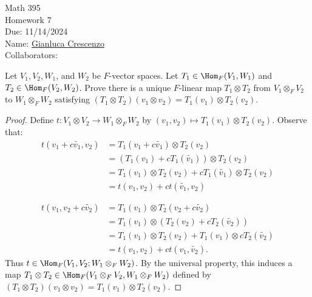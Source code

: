\documentclass[10pt,twoside,openany]{memoir}
\begin{document}
\begin{center}
    { \Large Math 395 \\[0.1in]Homework 7\\[0.1in]
    Due: 11/14/2024}\\[.25in]
    { Name:} {\underline{Gianluca Crescenzo\hspace*{2in}}}\\[0.15in]
    { Collaborators:} {\underline{}} \\
    \end{center}
    \vspace{4pt}
    \begin{exercise}
        Let $V_1,V_2,W_1$, and $W_2$ be $F$-vector spaces. Let $T_1 \in \Hom_F(V_1,W_1)$ and $T_2 \in \Hom_F(V_2,W_2)$. Prove there is a unique $F$-linear map $T_1 \otimes T_2$ from $V_1 \otimes_F V_2$ to $W_1 \otimes_F W_2$ satisfying $(T_1 \otimes T_2)(v_1 \otimes v_2) = T_1(v_1) \otimes T_2(v_2)$.
    \end{exercise}
        \begin{proof}
            Define $t:V_1 \otimes V_2 \rightarrow W_1 \otimes_F W_2$ by $(v_1,v_2) \mapsto T_1(v_1) \otimes T_2(v_2)$. Observe that:
                \begin{equation*}
                \begin{split}
                    t(v_1 + c\tilde{v_1},v_2)
                    & = T_1(v_1 + c \tilde{v_1}) \otimes T_2(v_2) \\
                    & = (T_1(v_1) + cT_1(\tilde{v_1})) \otimes T_2(v_2) \\
                    & = T_1(v_1) \otimes T_2(v_2) + cT_1(\tilde{v_1}) \otimes T_2(v_2) \\
                    & = t(v_1,v_2) + ct(\tilde{v_1},v_2) \\
                    &\phantom{a} \\
                    t(v_1,v_2 + c\tilde{v_2}) & = T_1(v_1) \otimes T_2(v_2 + c\tilde{v_2}) \\
                    & = T_1(v_1) \otimes (T_2(v_2) + cT_2(\tilde{v_2})) \\
                    & = T_1(v_1) \otimes T_2(v_2) + T_1(v_1) \otimes cT_2(\tilde{v_2}) \\
                    & = t(v_1,v_2) + ct(v_1,\tilde{v_2}).
                \end{split}
                \end{equation*}
            Thus $t \in \Hom_F(V_1,V_2;W_1 \otimes_F W_2)$. By the universal property, this induces a map $T_1 \otimes T_2 \in \Hom_F(V_1 \otimes_F V_2, W_1 \otimes_F W_2)$ defined by $(T_1 \otimes T_2)(v_1 \otimes v_2) = T_1(v_1) \otimes T_2(v_2)$.
        \end{proof}
\end{document}
